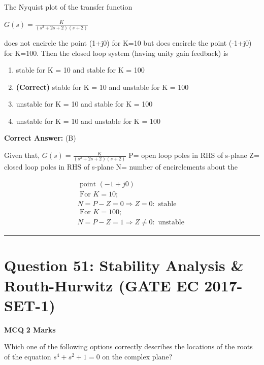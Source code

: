 \documentclass[11pt,a4paper]{article}
\begin{document}
\noindent The Nyquist plot of the transfer function 

$G(s)=\frac{K}{(s^{2}+2s+2)(s+2)}$

 does not encircle the point (1+j0) for K=10 but does encircle the point (-1+j0) for K=100. Then the closed loop system (having unity gain feedback) is


\begin{enumerate}[label=(\Alph*)]
    \item stable for K = 10 and stable for K = 100
    \item \textbf{(Correct)} stable for K = 10 and unstable for K = 100
    \item unstable for K = 10 and stable for K = 100
    \item unstable for K = 10 and unstable for K = 100
\end{enumerate}

\noindent \textbf{Correct Answer:} (B)

\begin{tcolorbox}[solbox, title=Detailed Solution -- Question 50]
Given that,
$G(s)=\frac{K}{\left(s^{2}+2 s+2\right)(s+2)}$
 P= open loop poles in RHS of s-plane 
 Z= closed loop poles in RHS of s-plane 
 N= number of encirclements about the

\[
\begin{array}{l} \text { point }(-1+j 0) \\ \text { For } K=10 ; \\ N=P-Z=0 \Rightarrow Z=0: \text { stable } \\ \text { For } K=100 ; \\ N=P-Z=1 \Rightarrow Z \neq 0: \text { unstable } \end{array}
\]
\end{tcolorbox}

\vspace{1.5em}
\hrule
\vspace{1.5em}

\section*{Question 51: Stability Analysis \& Routh-Hurwitz (GATE EC 2017-SET-1)}
\noindent \textbf{\color{primary}MCQ} \hfill \textbf{\color{secondary}2 Marks}


\noindent Which one of the following options correctly describes the locations of the roots of the equation $s^{4}+s^{2}+1=0$ on the complex plane?
\end{document}
